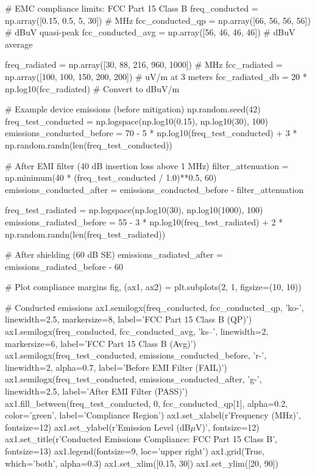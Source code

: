 \documentclass[11pt,a4paper]{article}
\begin{document}
\begin{pycode}
# EMC compliance limits: FCC Part 15 Class B
freq_conducted = np.array([0.15, 0.5, 5, 30])  # MHz
fcc_conducted_qp = np.array([66, 56, 56, 56])  # dBuV quasi-peak
fcc_conducted_avg = np.array([56, 46, 46, 46])  # dBuV average

freq_radiated = np.array([30, 88, 216, 960, 1000])  # MHz
fcc_radiated = np.array([100, 100, 150, 200, 200])  # uV/m at 3 meters
fcc_radiated_db = 20 * np.log10(fcc_radiated)  # Convert to dBuV/m

# Example device emissions (before mitigation)
np.random.seed(42)
freq_test_conducted = np.logspace(np.log10(0.15), np.log10(30), 100)
emissions_conducted_before = 70 - 5 * np.log10(freq_test_conducted) + 3 * np.random.randn(len(freq_test_conducted))

# After EMI filter (40 dB insertion loss above 1 MHz)
filter_attenuation = np.minimum(40 * (freq_test_conducted / 1.0)**0.5, 60)
emissions_conducted_after = emissions_conducted_before - filter_attenuation

freq_test_radiated = np.logspace(np.log10(30), np.log10(1000), 100)
emissions_radiated_before = 55 - 3 * np.log10(freq_test_radiated) + 2 * np.random.randn(len(freq_test_radiated))

# After shielding (60 dB SE)
emissions_radiated_after = emissions_radiated_before - 60

# Plot compliance margins
fig, (ax1, ax2) = plt.subplots(2, 1, figsize=(10, 10))

# Conducted emissions
ax1.semilogx(freq_conducted, fcc_conducted_qp, 'ko-', linewidth=2.5, markersize=8, label='FCC Part 15 Class B (QP)')
ax1.semilogx(freq_conducted, fcc_conducted_avg, 'ks--', linewidth=2, markersize=6, label='FCC Part 15 Class B (Avg)')
ax1.semilogx(freq_test_conducted, emissions_conducted_before, 'r-', linewidth=2, alpha=0.7, label='Before EMI Filter (FAIL)')
ax1.semilogx(freq_test_conducted, emissions_conducted_after, 'g-', linewidth=2.5, label='After EMI Filter (PASS)')
ax1.fill_between(freq_test_conducted, 0, fcc_conducted_qp[1], alpha=0.2, color='green', label='Compliance Region')
ax1.set_xlabel(r'Frequency (MHz)', fontsize=12)
ax1.set_ylabel(r'Emission Level (dB$\mu$V)', fontsize=12)
ax1.set_title(r'Conducted Emissions Compliance: FCC Part 15 Class B', fontsize=13)
ax1.legend(fontsize=9, loc='upper right')
ax1.grid(True, which='both', alpha=0.3)
ax1.set_xlim([0.15, 30])
ax1.set_ylim([20, 90])


\end{pycode}
\end{document}
